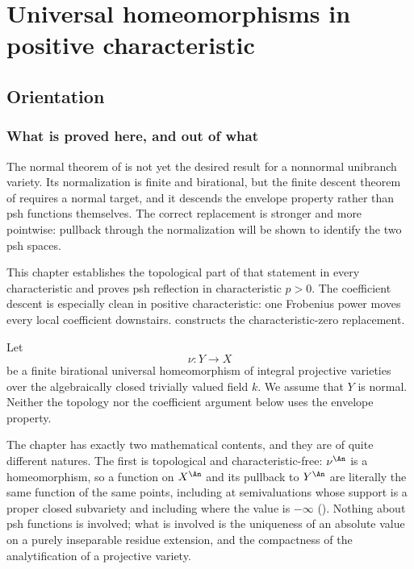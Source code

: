 \chapter{Universal homeomorphisms in positive characteristic}
\label{chap:bj-universal-homeomorphisms}

\section{Orientation}
\label{sec:ch43-orientation}

\subsection{What is proved here, and out of what}
\label{sec:ch43-what}

The normal theorem of  is not yet the desired
result for a nonnormal unibranch variety.
Its normalization is finite and birational, but the finite descent theorem of
 requires a normal target, and it descends the
envelope property rather than psh functions themselves.
The correct replacement is stronger and more pointwise:
pullback through the normalization will be shown to identify the two psh
spaces.

This chapter establishes the topological part of that statement in every
characteristic and proves psh reflection in characteristic $p>0$.
The coefficient descent is especially clean in positive characteristic:
one Frobenius power moves every local coefficient downstairs.
 constructs the
characteristic-zero replacement.

Let
\[
                         \nu:Y\longrightarrow X
\tag{43.1}\label{eq:bj-universal-map}
\]
be a finite birational universal homeomorphism of integral projective
varieties over the algebraically closed trivially valued field $k$.
We assume that $Y$ is normal.
Neither the topology nor the coefficient argument below uses the envelope
property.

The chapter has exactly two mathematical contents, and they are of quite
different natures.  The first is topological and characteristic-free:
$\nu^{\An}$ is a homeomorphism, so a function on $X^{\An}$ and its
pullback to $Y^{\An}$ are literally the same function of the same points,
including at semivaluations whose support is a proper closed subvariety and
including where the value is $-\infty$
().  Nothing about psh
functions is involved; what is involved is the uniqueness of an absolute
value on a purely inseparable residue extension, and the compactness of the
analytification of a projective variety.

